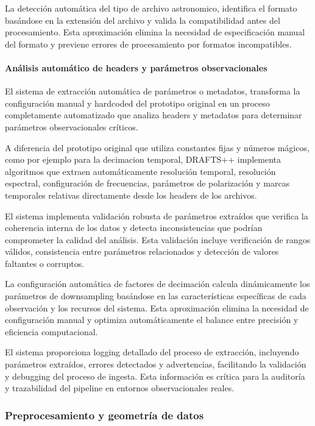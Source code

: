 La detección automática del tipo de archivo  astronomico, identifica el formato basándose en la extensión del archivo y valida la compatibilidad antes del procesamiento. Esta aproximación elimina la necesidad de especificación manual del formato y previene errores de procesamiento por formatos incompatibles.

\paragraph{Análisis automático de headers y parámetros observacionales}

El sistema de extracción automática de parámetros o metadatos, transforma la configuración manual y hardcoded del prototipo original en un proceso completamente automatizado que analiza headers y metadatos para determinar parámetros observacionales críticos.

A diferencia del prototipo original que utiliza constantes fijas y números mágicos, como por ejemplo para la decimacion temporal, DRAFTS++ implementa algoritmos que extraen automáticamente resolución temporal, resolución espectral, configuración de frecuencias, parámetros de polarización y marcas temporales relativas directamente desde los headers de los archivos.

El sistema implementa validación robusta de parámetros extraídos que verifica la coherencia interna de los datos y detecta inconsistencias que podrían comprometer la calidad del análisis. Esta validación incluye verificación de rangos válidos, consistencia entre parámetros relacionados y detección de valores faltantes o corruptos.

La configuración automática de factores de decimación calcula dinámicamente los parámetros de downsampling basándose en las características específicas de cada observación y los recursos del sistema. Esta aproximación elimina la necesidad de configuración manual y optimiza automáticamente el balance entre precisión y eficiencia computacional.

El sistema proporciona logging detallado del proceso de extracción, incluyendo parámetros extraídos, errores detectados y advertencias, facilitando la validación y debugging del proceso de ingesta. Esta información es crítica para la auditoría y trazabilidad del pipeline en entornos observacionales reales.

\subsubsection{Preprocesamiento y geometría de datos}

